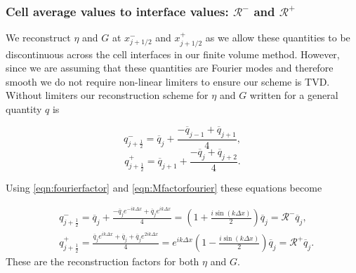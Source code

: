\subsubsection{Cell average values to interface values: $\mathcal{R}^-$ and $\mathcal{R}^+$}

We reconstruct $\eta$ and $G$ at $x^-_{j+1/2}$ and $x^+_{j+1/2}$ as we allow these quantities to be discontinuous across the cell interfaces in our finite volume method. However, since we are assuming that these quantities are Fourier modes and therefore smooth we do not require non-linear limiters to ensure our scheme is TVD. Without limiters our reconstruction scheme for $\eta$ and $G$ written for a general quantity $q$ is

\begin{equation*}
q^-_{j+\frac{1}{2}} = \overline{q}_j + \frac{- \overline{q}_{j - 1} + \overline{q}_{j+ 1} }{4},
\end{equation*}
\begin{equation*}
q^+_{j+\frac{1}{2}} = \overline{q}_{j+1} + \frac{- \overline{q}_{j} + \overline{q}_{j+ 2}}{4}.
\end{equation*}

Using \eqref{eqn:fourierfactor} and \eqref{eqn:Mfactorfourier} these equations become

\begin{subequations}
	\label{eqn:RpmfactorFDVM}
	\begin{align}
	&q^-_{j+\frac{1}{2}} =\overline{q}_j + \frac{- \overline{q}_{j} e^{-ik\Delta x} + \overline{q}_{j} e^{ik\Delta x}}{4} = \left(1  + \frac{i\sin\left(k\Delta x\right)}{2} \right)\overline{q}_{j} =\mathcal{R}^- \overline{q}_{j},\\
	&q^+_{j+\frac{1}{2}}= \frac{\overline{q}_{j}e^{ik\Delta x} + \overline{q}_{j} + \overline{q}_{j}e^{2ik\Delta x} }{4} = e^{ik\Delta x}\left(1  - \frac{i\sin\left(k\Delta x\right)}{2} \right)\overline{q}_{j} = \mathcal{R}^+ \overline{q}_{j}.
	\end{align}
\end{subequations}
These are the reconstruction factors for both $\eta$ and $G$.

